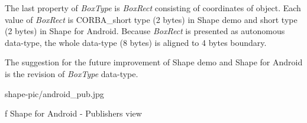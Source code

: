 The last property of {\em BoxType} is {\em BoxRect} consisting of coordinates of object. Each value of {\em BoxRect} is CORBA\_short type (2 bytes) in Shape demo and short type (2 bytes) in Shape for Android. Because {\em BoxRect} is presented as  autonomous data-type, the whole data-type (8 bytes) is aligned to 4 bytes boundary.

The suggestion for the future improvement of Shape demo and Shape for Android is the revision of {\em BoxType} data-type.

\midinsert
\picw=10cm \cinspic shape-pic/android_pub.jpg
\caption/f Shape for Android - Publishers view
\endinsert

